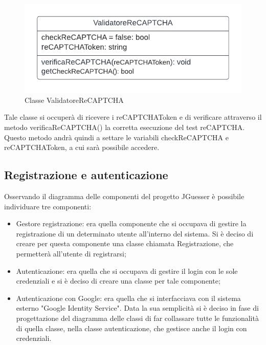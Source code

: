 \begin{figure}[!h]
\centering
\includegraphics[scale=0.35]{images/classe_validatore_recaptcha.png}
\caption{Classe ValidatoreReCAPTCHA}
\label{fig:classe_validatore_recaptcha}
\end{figure}
\noindent
Tale classe si occuperà di ricevere i reCAPTCHAToken e di verificare attraverso il metodo verificaReCAPTCHA() la corretta esecuzione del test reCAPTCHA. Questo metodo andrà quindi a settare le variabili checkReCAPTCHA e reCAPTCHAToken, a cui sarà possibile accedere.

\newpage
\subsection{Registrazione e autenticazione}
Osservando il diagramma delle componenti del progetto JGuesser è possibile individuare tre componenti: 
\begin{itemize}
    \item Gestore registrazione: era quella componente che si occupava di gestire la registrazione di un determinato utente all'interno del sistema. Si è deciso di creare per questa componente una classe chiamata Registrazione, che permetterà all'utente di registrarsi; 
    \item Autenticazione: era quella che si occupava di gestire il login con le sole credenziali e si è deciso di creare una classe per tale componente;
    \item Autenticazione con Google: era quella che si interfacciava con il sistema esterno "Google Identity Service". Data la sua semplicità si è deciso in fase di progettazione del diagramma delle classi di far collassare tutte le funzionalità di quella classe, nella classe autenticazione, che gestisce anche il login con credenziali.
\end{itemize}
\noindent
 
